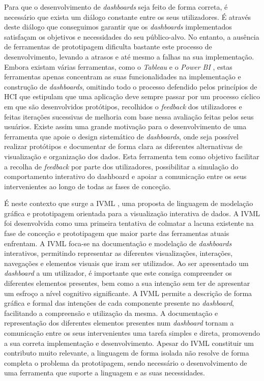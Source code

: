 Para que o desenvolvimento de \textit{dashboards} seja feito de forma correta, é necessário que exista um diálogo constante entre os seus utilizadores. É através deste diálogo que conseguimos garantir que os \textit{dashboards} implementados satisfaçam os objetivos e necessidades do seu público-alvo. No entanto, a ausência de ferramentas de prototipagem dificulta bastante este processo de desenvolvimento, levando a atrasos e até mesmo a falhas na sua implementação. Embora existam várias ferramentas, como o \textit{Tableau} \cite{tableau} e o \textit{Power BI} \cite{powerBI}, estas ferramentas apenas concentram as suas funcionalidades na implementação e construção de \textit{dashboards}, omitindo todo o processo defendido pelos princípios de \gls{HCI} que estipulam que uma aplicação deve sempre passar por um processo cíclico em que são desenvolvidos protótipos, recolhidos o \textit{feedback} dos utilizadores e feitas iterações sucessivas de melhoria com base nessa avaliação feitas pelos seus usuários. Existe assim uma grande motivação para o desenvolvimento de uma ferramenta que apoie o design sistemático de \textit{dashboards}, onde seja possível realizar protótipos e documentar de forma clara as diferentes alternativas de visualização e organização dos dados. Esta ferramenta tem como objetivo facilitar a recolha de \textit{feedback} por parte dos utilizadores, possibilitar a simulação do comportamento interativo do dashboard e apoiar a comunicação entre os seus intervenientes ao longo de todas as fases de conceção.

É neste contexto que surge a \gls{IVML} \cite{Ferreira2023IVML}, uma proposta de linguagem de modelação gráfica e prototipagem orientada para a visualização interativa de dados. A \gls{IVML} foi desenvolvida como uma primeira tentativa de colmatar a lacuna existente na fase de conceção e prototipagem que maior parte das ferramentas atuais enfrentam. A \gls{IVML} foca-se na documentação e modelação de \textit{dashboards} interativos, permitindo representar as diferentes visualizações, interações, navegações e elementos visuais que iram ser utilizados. Ao ser apresentado um \textit{dashboard} a um utilizador, é importante que este consiga compreender os diferentes elementos presentes, bem como a sua intenção sem ter de apresentar um esfroço a nível cognitivo significante. A \gls{IVML} permite a descrição de forma gráfica e formal das intenções de cada componente presente no \textit{dashboard}, facilitando a compreensão e utilização da mesma. A documentação e representação dos diferentes elementos presentes num \textit{dashboard} tornam a comunicação entre os seus intervenientes uma tarefa simples e direta, promovendo a sua correta implementação e desenvolvimento. Apesar do \gls{IVML} constituir um contributo muito relevante, a linguagem de forma isolada não resolve de forma completa o problema da prototipagem, sendo necessário o desenvolvimento de uma ferramenta que suporte a linguagem e as suas necessidades.

